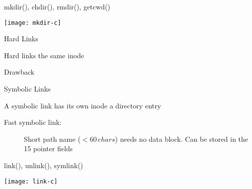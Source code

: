 \begin{frame}{\ttfamily mkdir(), chdir(), rmdir(), getcwd()}
  \begin{center}
    \texttt{[image: mkdir-c]}
  \end{center}
\end{frame}

\begin{frame}{Hard Links}
  \begin{block}{Hard links {\pright} the same inode}
    \begin{center}
    \end{center}
  \end{block}
\end{frame}

\begin{frame}
  \begin{block}{Drawback}
    \begin{center}
    \end{center}
  \end{block}
\end{frame}

\begin{frame}{Symbolic Links}
  \begin{block}{A symbolic link has its own inode {\pright} a directory entry}
    \begin{center}
    \end{center}
  \end{block}
  \begin{description}
  \item[Fast symbolic link:] Short path name ($< 60\,chars$) needs no data block. Can be
    stored in the 15 pointer fields
  \end{description}
\end{frame}

\begin{frame}{\ttfamily link(), unlink(), symlink()}
  \begin{center}
    \texttt{[image: link-c]}
  \end{center}
\end{frame}


